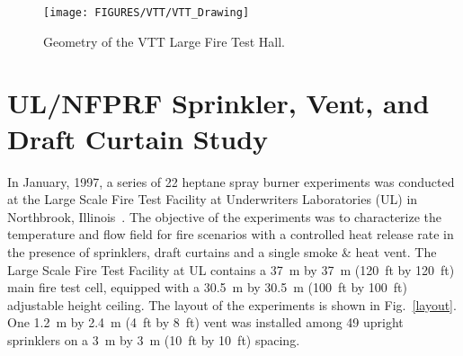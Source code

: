 \begin{sidewaysfigure}[p]
\begin{center}
\texttt{[image: FIGURES/VTT/VTT\_Drawing]}
\end{center}
\caption{Geometry of the VTT Large Fire Test Hall.}
\label{VTT_Drawing}
\end{sidewaysfigure}


\clearpage


\section{UL/NFPRF Sprinkler, Vent, and Draft Curtain Study}
\label{UL_NFPRF_Description}

In January, 1997, a series of 22 heptane spray burner experiments was conducted at the Large Scale Fire Test Facility at Underwriters Laboratories
(UL) in Northbrook, Illinois~\cite{Sheppard:1}. The objective of the experiments was to characterize the temperature and flow field for fire
scenarios with a controlled heat release rate in the presence of sprinklers, draft curtains and a single smoke \& heat vent.
The Large Scale Fire Test Facility at UL contains a 37~m by 37~m (120~ft by 120~ft) main fire test cell, equipped with a 30.5~m by 30.5~m (100~ft by
100~ft) adjustable height ceiling. The layout of the experiments is shown in Fig.~\ref{layout}. One 1.2~m by 2.4~m (4~ft by 8~ft) vent was installed
among 49 upright sprinklers on a 3~m by 3~m (10~ft by 10~ft) spacing.

